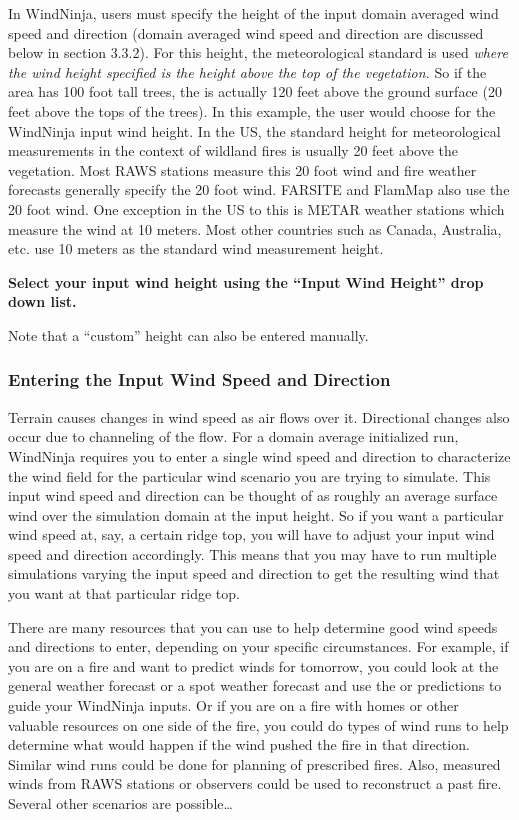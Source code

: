 \documentclass[12pt]{article}
\begin{document}
In WindNinja, users must specify the height of the input domain averaged wind speed and direction (domain averaged wind speed and direction are discussed below in section 3.3.2).  For this height, the meteorological standard is used \textit{where the wind height specified is the height above the top of the vegetation.}  So if the area has 100 foot tall trees, the  is actually 120 feet above the ground surface (20 feet above the tops of the trees).  In this example, the user would choose  for the WindNinja input wind height.  In the US, the standard height for meteorological measurements in the context of wildland fires is usually 20 feet above the vegetation.  Most RAWS stations measure this 20 foot wind and fire weather forecasts generally specify the 20 foot wind.  FARSITE and FlamMap also use the 20 foot wind.  One exception in the US to this is METAR weather stations which measure the wind at 10 meters.  Most other countries such as Canada, Australia, etc. use 10 meters as the standard wind measurement height.

\textbf{\color{red} Select your input wind height using the “Input Wind Height” drop down list.}

Note that a “custom” height can also be entered manually.

\subsubsection{Entering the Input Wind Speed and Direction}

Terrain causes changes in wind speed as air flows over it.  Directional changes also occur due to channeling of the flow.  For a  domain average initialized run, WindNinja requires you to enter a single wind speed and direction to characterize the wind field for the particular wind scenario you are trying to simulate.  This input wind speed and direction can be thought of as roughly an average surface wind over the simulation domain at the input height.  So if you want a particular wind speed at, say, a certain ridge top, you will have to adjust your input wind speed and direction accordingly.  This means that you may have to run multiple simulations varying the input speed and direction to get the resulting wind that you want at that particular ridge top.

There are many resources that you can use to help determine good wind speeds and directions to enter, depending on your specific circumstances.  For example, if you are on a fire and want to predict winds for tomorrow, you could look at the general weather forecast or a spot weather forecast and use the  or  predictions to guide your WindNinja inputs.  Or if you are on a fire with homes or other valuable resources on one side of the fire, you could do  types of wind runs to help determine what would happen if the wind pushed the fire in that direction.  Similar  wind runs could be done for planning of prescribed fires.  Also, measured winds from RAWS stations or observers could be used to reconstruct a past fire.  Several other scenarios are possible…
\end{document}
